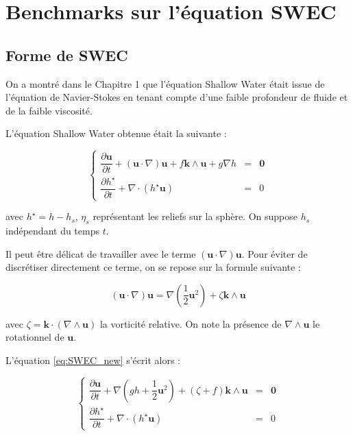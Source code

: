 \chapter{Benchmarks sur l'équation SWEC}

\section{Forme de SWEC}

On a montré dans le Chapitre 1 que l'équation Shallow Water était issue de l'équation de Navier-Stokes en tenant compte d'une faible profondeur de fluide et de la faible viscosité.

L'équation Shallow Water obtenue était la suivante :

\begin{equation}
\label{eq:SWEC_new}
\left\lbrace
\begin{array}{rcl}
\dfrac{\partial \mathbf{u}}{\partial t} + \left( \mathbf{u} \cdot \nabla \right) \mathbf{u} + f \mathbf{k} \wedge \mathbf{u} + g \nabla h & = & \mathbf{0} \\
\dfrac{\partial h^{\star}}{\partial t} + \nabla \cdot \left( h^{\star} \mathbf{u} \right) & = & 0
\end{array}
\right.
\end{equation}

avec $h^{\star} = h - h_s$, $\eta_s$ représentant les reliefs sur la sphère. On suppose $h_s$ indépendant du temps $t$.

Il peut être délicat de travailler avec le terme $\left( \mathbf{u} \cdot \nabla \right) \mathbf{u}$. Pour éviter de discrétiser directement ce terme, on se repose sur la formule suivante :

\begin{equation}
\left( \mathbf{u} \cdot \nabla \right) \mathbf{u} = \nabla \left( \dfrac{1}{2} \mathbf{u}^2 \right) + \zeta \mathbf{k} \wedge \mathbf{u}
\end{equation}

avec $\zeta = \mathbf{k} \cdot \left( \nabla \wedge \mathbf{u} \right)$ la vorticité relative. On note la présence de $\nabla \wedge \mathbf{u}$ le rotationnel de $\mathbf{u}$.

L'équation \eqref{eq:SWEC_new} s'écrit alors :

\begin{equation}
\label{eq:SWEC_vectform}
\left\lbrace
\begin{array}{rcl}
\dfrac{\partial \mathbf{u}}{\partial t} + \nabla \left( g h + \dfrac{1}{2} \mathbf{u}^2  \right) + \left( \zeta + f \right) \mathbf{k} \wedge \mathbf{u} & = & \mathbf{0} \\
\dfrac{\partial h^{\star}}{\partial t} + \nabla \cdot \left( h^{\star} \mathbf{u} \right) & = & 0
\end{array}
\right.
\end{equation}

